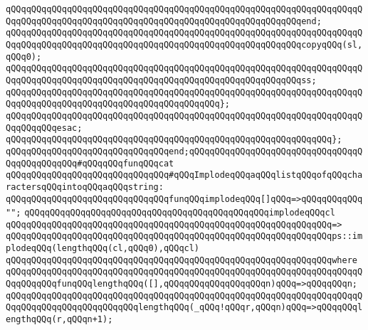 \verb|qQQqqQQqqQQqqQQqqQQqqQQqqQQqqQQqqQQqqQQqqQQqqQQqqQQqqQQqqQQqqQQqqQQqqQQqqQQqqQQqqQQqqQQqqQQqqQQqqQQqqQQqqQQqqQQqqQQqqQQqqQQqqQQqend;|\newline
\newline
\verb|qQQqqQQqqQQqqQQqqQQqqQQqqQQqqQQqqQQqqQQqqQQqqQQqqQQqqQQqqQQqqQQqqQQqqQQqqQQqqQQqqQQqqQQqqQQqqQQqqQQqqQQqqQQqqQQqqQQqqQQqqQQqqQQqcopyqQQq(sl,qQQq0);|\newline
\verb|qQQqqQQqqQQqqQQqqQQqqQQqqQQqqQQqqQQqqQQqqQQqqQQqqQQqqQQqqQQqqQQqqQQqqQQqqQQqqQQqqQQqqQQqqQQqqQQqqQQqqQQqqQQqqQQqqQQqqQQqqQQqqQQqss;|\newline
\verb|qQQqqQQqqQQqqQQqqQQqqQQqqQQqqQQqqQQqqQQqqQQqqQQqqQQqqQQqqQQqqQQqqQQqqQQqqQQqqQQqqQQqqQQqqQQqqQQqqQQqqQQqqQQqqQQq};|\newline
\verb|qQQqqQQqqQQqqQQqqQQqqQQqqQQqqQQqqQQqqQQqqQQqqQQqqQQqqQQqqQQqqQQqqQQqqQQqqQQqqQQqesac;|\newline
\verb|qQQqqQQqqQQqqQQqqQQqqQQqqQQqqQQqqQQqqQQqqQQqqQQqqQQqqQQqqQQqqQQq};|\newline
\verb|qQQqqQQqqQQqqQQqqQQqqQQqqQQqqQQqend;qQQqqQQqqQQqqQQqqQQqqQQqqQQqqQQqqQQqqQQqqQQqqQQq#qQQqqQQqfunqQQqcat|\newline
\newline
\newline
\verb|qQQqqQQqqQQqqQQqqQQqqQQqqQQqqQQq#qQQqImplodeqQQqaqQQqlistqQQqofqQQqcharactersqQQqintoqQQqaqQQqstring:|\newline
\newline
\verb|qQQqqQQqqQQqqQQqqQQqqQQqqQQqqQQqfunqQQqimplodeqQQq[]qQQq=>qQQqqQQqqQQq"";|\newline
\newline
\verb|qQQqqQQqqQQqqQQqqQQqqQQqqQQqqQQqqQQqqQQqqQQqqQQqimplodeqQQqcl|\newline
\verb|qQQqqQQqqQQqqQQqqQQqqQQqqQQqqQQqqQQqqQQqqQQqqQQqqQQqqQQqqQQqqQQq=>|\newline
\verb|qQQqqQQqqQQqqQQqqQQqqQQqqQQqqQQqqQQqqQQqqQQqqQQqqQQqqQQqqQQqqQQqps::implodeqQQq(lengthqQQq(cl,qQQq0),qQQqcl)|\newline
\verb|qQQqqQQqqQQqqQQqqQQqqQQqqQQqqQQqqQQqqQQqqQQqqQQqqQQqqQQqqQQqqQQqwhere|\newline
\verb|qQQqqQQqqQQqqQQqqQQqqQQqqQQqqQQqqQQqqQQqqQQqqQQqqQQqqQQqqQQqqQQqqQQqqQQqqQQqqQQqfunqQQqlengthqQQq([],qQQqqQQqqQQqqQQqqQQqn)qQQq=>qQQqqQQqn;|\newline
\verb|qQQqqQQqqQQqqQQqqQQqqQQqqQQqqQQqqQQqqQQqqQQqqQQqqQQqqQQqqQQqqQQqqQQqqQQqqQQqqQQqqQQqqQQqqQQqqQQqlengthqQQq(_qQQq!qQQqr,qQQqn)qQQq=>qQQqqQQqlengthqQQq(r,qQQqn+1);|\newline
